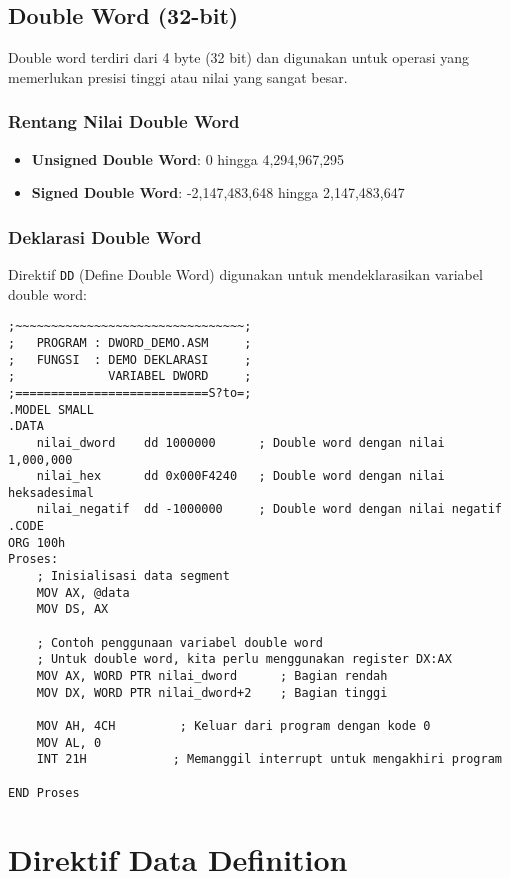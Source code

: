 \documentclass[../main.tex]{subfiles}
\begin{document}
\subsection{Double Word (32-bit)}
Double word terdiri dari 4 byte (32 bit) dan digunakan untuk operasi yang memerlukan presisi tinggi atau nilai yang sangat besar.

\subsubsection{Rentang Nilai Double Word}
\begin{itemize}
    \item \textbf{Unsigned Double Word}: 0 hingga 4,294,967,295
    \item \textbf{Signed Double Word}: -2,147,483,648 hingga 2,147,483,647
\end{itemize}

\subsubsection{Deklarasi Double Word}
Direktif \texttt{DD} (Define Double Word) digunakan untuk mendeklarasikan variabel double word:

\begin{lstlisting}[language={[x86masm]Assembler}, caption=Deklarasi Variabel Double Word, label={lst:dword-declaration}]
;~~~~~~~~~~~~~~~~~~~~~~~~~~~~~~~~;
;   PROGRAM : DWORD_DEMO.ASM     ;
;   FUNGSI  : DEMO DEKLARASI     ;
;             VARIABEL DWORD     ;
;===========================S?to=;
.MODEL SMALL
.DATA
    nilai_dword    dd 1000000      ; Double word dengan nilai 1,000,000
    nilai_hex      dd 0x000F4240   ; Double word dengan nilai heksadesimal
    nilai_negatif  dd -1000000     ; Double word dengan nilai negatif
.CODE
ORG 100h
Proses:
    ; Inisialisasi data segment
    MOV AX, @data
    MOV DS, AX
    
    ; Contoh penggunaan variabel double word
    ; Untuk double word, kita perlu menggunakan register DX:AX
    MOV AX, WORD PTR nilai_dword      ; Bagian rendah
    MOV DX, WORD PTR nilai_dword+2    ; Bagian tinggi
    
    MOV AH, 4CH         ; Keluar dari program dengan kode 0
    MOV AL, 0
    INT 21H            ; Memanggil interrupt untuk mengakhiri program

END Proses
\end{lstlisting}

\section{Direktif Data Definition}
\end{document}
